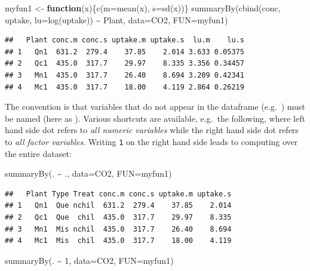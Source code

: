 \documentclass[
]{article}
\newenvironment{Shaded}{\begin{snugshade}}{\end{snugshade}}
\newcommand{\AttributeTok}[1]{\textcolor[rgb]{0.77,0.63,0.00}{#1}}
\newcommand{\ControlFlowTok}[1]{\textcolor[rgb]{0.13,0.29,0.53}{\textbf{#1}}}
\newcommand{\DecValTok}[1]{\textcolor[rgb]{0.00,0.00,0.81}{#1}}
\newcommand{\FunctionTok}[1]{\textcolor[rgb]{0.00,0.00,0.00}{#1}}
\newcommand{\NormalTok}[1]{#1}
\newcommand{\OtherTok}[1]{\textcolor[rgb]{0.56,0.35,0.01}{#1}}
\newcommand{\SpecialCharTok}[1]{\textcolor[rgb]{0.00,0.00,0.00}{#1}}
\begin{document}
\begin{Shaded}
\begin{Highlighting}[]
\NormalTok{myfun1 }\OtherTok{\textless{}{-}} \ControlFlowTok{function}\NormalTok{(x)\{}\FunctionTok{c}\NormalTok{(}\AttributeTok{m=}\FunctionTok{mean}\NormalTok{(x), }\AttributeTok{s=}\FunctionTok{sd}\NormalTok{(x))\}}
\FunctionTok{summaryBy}\NormalTok{(}\FunctionTok{cbind}\NormalTok{(conc, uptake, }\AttributeTok{lu=}\FunctionTok{log}\NormalTok{(uptake)) }\SpecialCharTok{\textasciitilde{}}\NormalTok{ Plant, }\AttributeTok{data=}\NormalTok{CO2, }\AttributeTok{FUN=}\NormalTok{myfun1)}
\end{Highlighting}
\end{Shaded}

\begin{verbatim}
##   Plant conc.m conc.s uptake.m uptake.s  lu.m    lu.s
## 1   Qn1  631.2  279.4    37.85    2.014 3.633 0.05375
## 2   Qc1  435.0  317.7    29.97    8.335 3.356 0.34457
## 3   Mn1  435.0  317.7    26.40    8.694 3.209 0.42341
## 4   Mc1  435.0  317.7    18.00    4.119 2.864 0.26219
\end{verbatim}

The convention is that variables that do not appear in the dataframe
(e.g.~) must be named (here as ). Various
shortcuts are available, e.g.~the following, where left hand side dot
refers to \emph{all numeric variables} while the right hand side dot
refers to \emph{all factor variables}. Writing \texttt{1} on the right
hand side leads to computing over the entire dataset:

\begin{Shaded}
\begin{Highlighting}[]
\FunctionTok{summaryBy}\NormalTok{(. }\SpecialCharTok{\textasciitilde{}}\NormalTok{ ., }\AttributeTok{data=}\NormalTok{CO2, }\AttributeTok{FUN=}\NormalTok{myfun1)}
\end{Highlighting}
\end{Shaded}

\begin{verbatim}
##   Plant Type Treat conc.m conc.s uptake.m uptake.s
## 1   Qn1  Que nchil  631.2  279.4    37.85    2.014
## 2   Qc1  Que  chil  435.0  317.7    29.97    8.335
## 3   Mn1  Mis nchil  435.0  317.7    26.40    8.694
## 4   Mc1  Mis  chil  435.0  317.7    18.00    4.119
\end{verbatim}

\begin{Shaded}
\begin{Highlighting}[]
\FunctionTok{summaryBy}\NormalTok{(. }\SpecialCharTok{\textasciitilde{}} \DecValTok{1}\NormalTok{, }\AttributeTok{data=}\NormalTok{CO2, }\AttributeTok{FUN=}\NormalTok{myfun1)}
\end{Highlighting}
\end{Shaded}
\end{document}
